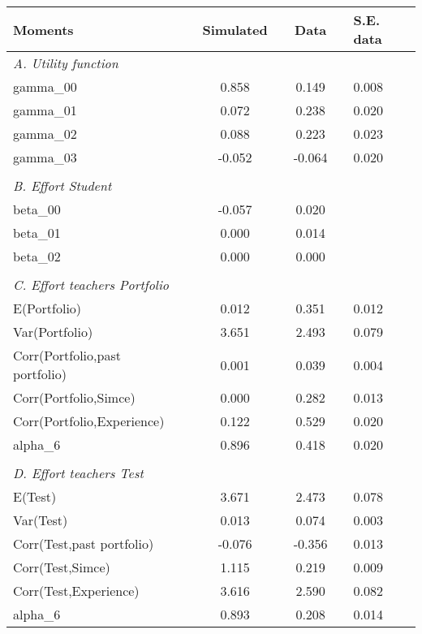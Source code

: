 \begin{tabular}{lcccc}
\hline
Moments &  & Simulated & & Data & & S.E. data \bigstrut\\
\hline
\emph{A. Utility function} &       &       &       &     &      & \\
gamma_00 &  & 0.858 &  &  0.149 &  & 0.008 \\
gamma_01 &  & 0.072 &  &  0.238 &  & 0.020 \\
gamma_02 &  & 0.088 &  &  0.223 &  & 0.023 \\
gamma_03 &  & -0.052 &  &  -0.064 &  & 0.020 \\
 &       &       &       &  \\
\emph{B. Effort Student} &       &       &       & & &  \\
beta_00 &  &  -0.057 &  & 0.020 \\
beta_01 &  &  0.000 &  & 0.014 \\
beta_02 &  &  0.000 &  & 0.000 \\
 &       &       &       &  \\
\emph{C. Effort teachers Portfolio} &       &       &       &  & & \\
E(Portfolio) &  &  0.012 &  &  0.351 &  & 0.012 \\
Var(Portfolio) &  &  3.651 &  &  2.493 &  & 0.079 \\
Corr(Portfolio,past portfolio) &  &  0.001 &  &  0.039 &  & 0.004 \\
Corr(Portfolio,Simce) &  &  0.000 &  &  0.282 &  & 0.013 \\
Corr(Portfolio,Experience) &  &  0.122 &  &  0.529 &  & 0.020 \\
alpha_6 &  &  0.896 &  &  0.418 &  & 0.020 \\
 &       &       &       &  \\
\emph{D. Effort teachers Test} &       &       &       &  & & \\
E(Test) &  &  3.671 &  &  2.473 &  & 0.078 \\
Var(Test) &  &  0.013 &  &  0.074 &  & 0.003 \\
Corr(Test,past portfolio) &  &  -0.076 &  &  -0.356 &  & 0.013 \\
Corr(Test,Simce) &  &  1.115 &  &  0.219 &  & 0.009 \\
Corr(Test,Experience) &  &  3.616 &  &  2.590 &  & 0.082 \\
alpha_6 &  &  0.893 &  &  0.208 &  & 0.014 \\
\hline
\end{tabular}
